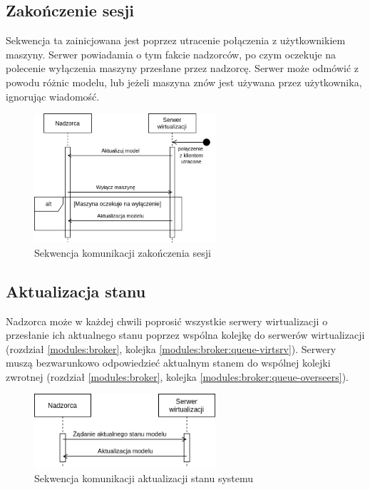 \documentclass[../opis-rozwiazania.tex]{subfiles}
\begin{document}
\subsection{Zakończenie sesji}

Sekwencja ta zainicjowana jest poprzez utracenie połączenia z użytkownikiem maszyny.
Serwer powiadamia o tym fakcie nadzorców, po czym oczekuje na polecenie wyłączenia maszyny przesłane przez nadzorcę. Serwer może odmówić z powodu różnic modelu, lub jeżeli maszyna znów jest używana przez użytkownika, ignorując wiadomość.

\begin{figure}[H]
  \centering
  \includegraphics[width=0.6\textwidth]{../diagrams/sequence_diagrams/konczenie_sesji.png}
  \caption{Sekwencja komunikacji zakończenia sesji}
  \label{figure:diagrams:sequence_diagrams:konczenie_sesji}
\end{figure}

\subsection{Aktualizacja stanu}

Nadzorca może w każdej chwili poprosić wszystkie serwery wirtualizacji
o przesłanie ich aktualnego stanu poprzez wspólna kolejkę do serwerów wirtualizacji (rozdział \ref{modules:broker}, kolejka \ref{modules:broker:queue-virtsrv}).
Serwery muszą bezwarunkowo odpowiedzieć aktualnym stanem do wspólnej kolejki zwrotnej (rozdział \ref{modules:broker}, kolejka \ref{modules:broker:queue-overseers}).

\begin{figure}[H]
  \centering
  \includegraphics[width=0.6\textwidth]{../diagrams/sequence_diagrams/aktualizacja_stanu.png}
  \caption{Sekwencja komunikacji aktualizacji stanu systemu}
  \label{figure:diagrams:sequence_diagrams:aktualizacja_stanu}
\end{figure}
\end{document}
